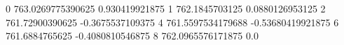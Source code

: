 0 763.0269775390625 0.930419921875
1 762.1845703125 0.0880126953125
2 761.72900390625 -0.3675537109375
4 761.5597534179688 -0.53680419921875
6 761.6884765625 -0.4080810546875
8 762.0965576171875 0.0
